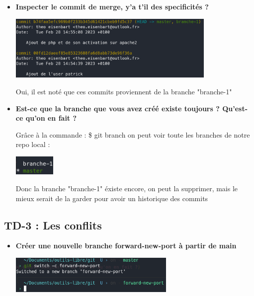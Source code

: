 \documentclass[12pt]{article}
\begin{document}
\begin{itemize}
  \item \textbf{Inspecter le commit de merge, y'a t'il des specificités ?}
  \vspace{0.3cm}

  \includegraphics[width=10cm]{images/screen-git-td2-11.png}
  \vspace{0.3cm}

  Oui, il est noté que ces commits proviennent de la branche "branche-1"
\end{itemize}
\vspace{0.3cm}

\begin{itemize}
  \item \textbf{Est-ce que la branche que vous avez créé existe toujours ? Qu'est-ce qu'on en fait ?}
  \vspace{0.3cm}

  Grâce à la commande : \newline
  \$ git branch \newline
  on peut voir toute les branches de notre repo local :
  \vspace{0.3cm}

  \includegraphics[width=2cm]{images/screen-git-td2-12.png}
  \vspace{0.3cm}

  Donc la branche "branche-1" éxiste encore, on peut la supprimer, mais le mieux serait de la garder pour avoir un
  historique des commits
\end{itemize}
\vspace{0.3cm}

  \subsection{TD-3 : Les conflits}
  \vspace{0.3cm}

\begin{itemize}
  \item \textbf{Créer une nouvelle branche forward-new-port à partir de main}
  \vspace{0.3cm}

  \includegraphics[width=8cm]{images/screen-git-td3-1.png}
\end{itemize}
\end{document}

